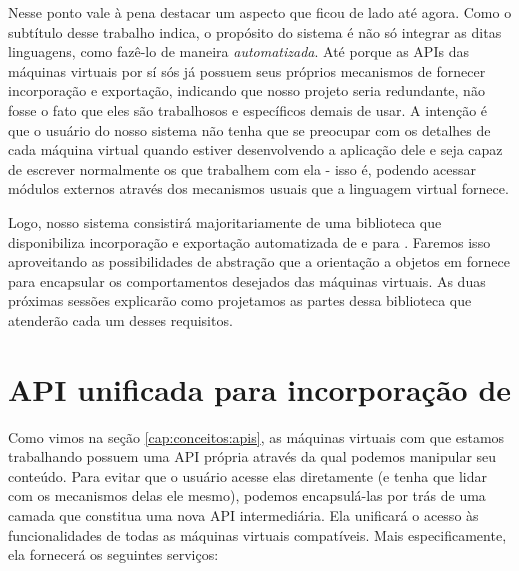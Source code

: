 
    Nesse ponto vale à pena destacar um aspecto que ficou de lado até agora.
    Como o subtítulo desse trabalho indica, o propósito do sistema é não só
    integrar as ditas linguagens, como fazê-lo de maneira \textit{automatizada}.
    Até porque as APIs das máquinas virtuais por sí sós já possuem seus próprios
    mecanismos de fornecer incorporação e exportação, indicando que nosso
    projeto seria redundante, não fosse o fato que eles são trabalhosos e
    específicos demais de usar. A intenção é que o usuário do nosso sistema não
    tenha que se preocupar com os detalhes de cada máquina virtual quando
    estiver desenvolvendo a aplicação dele e seja capaz de escrever normalmente
    os  que trabalhem com ela - isso é, podendo acessar módulos
    externos através dos mecanismos usuais que a linguagem virtual fornece.

    Logo, nosso sistema consistirá majoritariamente de uma biblioteca \CXX{}
    que disponibiliza incorporação e exportação automatizada de e para .
    Faremos isso aproveitando as possibilidades de abstração que a orientação a
    objetos em \CXX{} fornece para encapsular os comportamentos desejados das
    máquinas virtuais. As duas próximas
    sessões explicarão como projetamos as partes dessa biblioteca que atenderão
    cada um desses requisitos.

  \section{API unificada para incorporação de }
  \label{cap:estrutura:opa}

    Como vimos na seção \ref{cap:conceitos:apis}, as máquinas virtuais com que
    estamos trabalhando possuem uma API própria através da qual podemos
    manipular seu conteúdo. Para evitar que o usuário acesse elas diretamente
    (e tenha que lidar com os mecanismos delas ele mesmo), podemos encapsulá-las
    por trás de uma camada que constitua uma nova API intermediária. Ela
    unificará o acesso às funcionalidades de todas as máquinas virtuais compatíveis.
    Mais especificamente, ela fornecerá os seguintes serviços:

